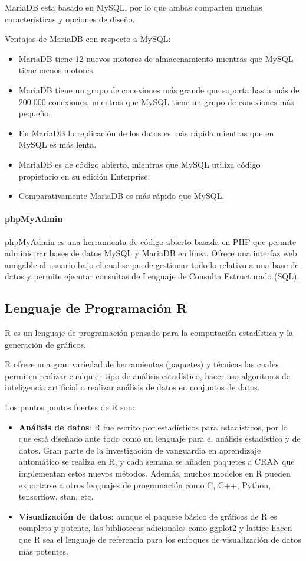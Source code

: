 \documentclass[../../main.tex]{subfiles}
\begin{document}
MariaDB esta basado en MySQL, por lo que ambas comparten muchas características y opciones de diseño.

Ventajas de MariaDB con respecto a MySQL:
\begin{itemize}
    \item MariaDB tiene 12 nuevos motores de almacenamiento mientras que MySQL tiene menos motores.
    \item MariaDB tiene un grupo de conexiones más grande que soporta hasta más de 200.000 conexiones, mientras que MySQL tiene un grupo de conexiones más pequeño.
    \item En MariaDB la replicación de los datos es más rápida mientras que en MySQL es más lenta.
    \item MariaDB es de código abierto, mientras que MySQL utiliza código propietario en su edición Enterprise.
    \item Comparativamente MariaDB es más rápido que MySQL.
\end{itemize}

\paragraph{phpMyAdmin}
phpMyAdmin\cite{doc12} es una herramienta de código abierto basada en PHP que permite administrar bases de datos MySQL y MariaDB en línea. Ofrece una interfaz web amigable al usuario bajo el cual se puede gestionar todo lo relativo a una base de datos y permite ejecutar consultas de Lenguaje de Consulta Estructurado (SQL).
\newpage
\cleardoublepage



\subsection{Lenguaje de Programación R}
R\cite{doc16} es un lenguaje de programación pensado para la computación estadística y la generación de gráficos. 

R ofrece una gran variedad de herramientas (paquetes) y técnicas las cuales permiten realizar cualquier tipo de análisis estadístico, hacer uso algoritmos de inteligencia artificial o realizar análisis de datos en conjuntos de datos.

Los puntos puntos fuertes de R son:
\begin{itemize}
    \item \textbf{Análisis de datos}: R fue escrito por estadísticos para estadísticos, por lo que está diseñado ante todo como un lenguaje para el análisis estadístico y de datos. Gran parte de la investigación de vanguardia en aprendizaje automático se realiza en R, y cada semana se añaden paquetes a CRAN que implementan estos nuevos métodos. Además, muchos modelos en R pueden exportarse a otros lenguajes de programación como C, C++, Python, tensorflow, stan, etc.
    
    \item \textbf{Visualización de datos}: aunque el paquete básico de gráficos de R es completo y potente, las bibliotecas adicionales como ggplot2 y lattice hacen que R sea el lenguaje de referencia para los enfoques de visualización de datos más potentes.
\end{itemize}
\newpage
\cleardoublepage
\end{document}
